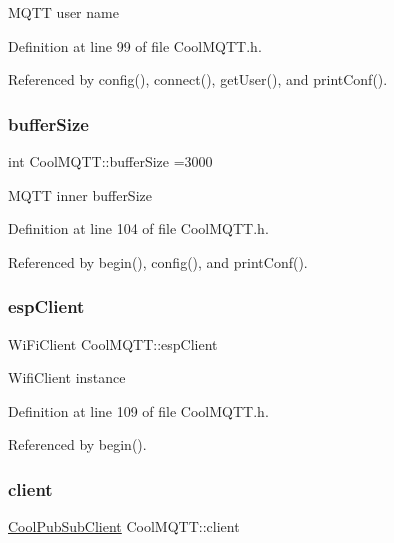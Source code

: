 M\+Q\+TT user name 

Definition at line 99 of file Cool\+M\+Q\+T\+T.\+h.



Referenced by config(), connect(), get\+User(), and print\+Conf().

\mbox{\label{class_cool_m_q_t_t_a7f3cf26b51d6770f216e42c5ef13ca9f}} 
\subsubsection{\texorpdfstring{buffer\+Size}{bufferSize}}
{\footnotesize\ttfamily int Cool\+M\+Q\+T\+T\+::buffer\+Size =3000\hspace{0.3cm}{\ttfamily [private]}}

M\+Q\+TT inner buffer\+Size 

Definition at line 104 of file Cool\+M\+Q\+T\+T.\+h.



Referenced by begin(), config(), and print\+Conf().

\mbox{\label{class_cool_m_q_t_t_acc30a0200967374a524092a8a806502a}} 
\subsubsection{\texorpdfstring{esp\+Client}{espClient}}
{\footnotesize\ttfamily Wi\+Fi\+Client Cool\+M\+Q\+T\+T\+::esp\+Client\hspace{0.3cm}{\ttfamily [private]}}

Wifi\+Client instance 

Definition at line 109 of file Cool\+M\+Q\+T\+T.\+h.



Referenced by begin().

\mbox{\label{class_cool_m_q_t_t_afed1372683c44893b4668d0f1771f514}} 
\subsubsection{\texorpdfstring{client}{client}}
{\footnotesize\ttfamily \hyperlink{class_cool_pub_sub_client}{Cool\+Pub\+Sub\+Client} Cool\+M\+Q\+T\+T\+::client\hspace{0.3cm}{\ttfamily [private]}}

